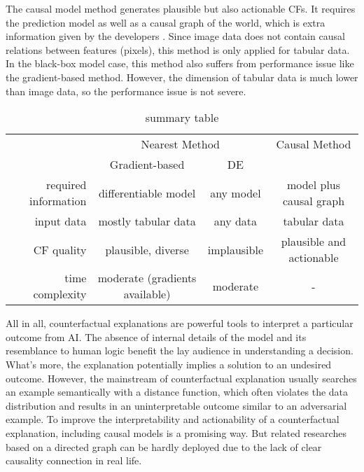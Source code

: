The causal model method generates plausible but also actionable CFs. It requires the prediction model as well as a causal graph of the world, which is extra information given by the developers \cite{preservingCausal}. Since image data does not contain causal relations between features (pixels), this method is only applied for tabular data. In the black-box model case, this method also suffers from performance issue like the gradient-based method. However, the dimension of tabular data is much lower than image data, so the performance issue is not severe.

\begin{table}
  \centering
\caption{summary table}
\begin{tabular}{|r|c|c|c|}
  \hline
   & \multicolumn{2}{c|}{Nearest Method} & Causal Method\\
   \cline{2-3}
   & Gradient-based & DE &  \\
   \hline
  required information & differentiable model  & any model & model plus causal graph \\
  input data & mostly tabular data & any data & tabular data \\
  CF quality & plausible, diverse& implausible& plausible and actionable\\
  time complexity & moderate (gradients available) &moderate& -\\
  \hline
\end{tabular}\label{tab:summary}

\label{summary table}
  \end{table}
All in all, counterfactual explanations are powerful tools to interpret a particular outcome from AI. The absence of internal details of the model and its resemblance to human logic benefit the lay audience in understanding a decision. What's more, the explanation potentially implies a solution to an undesired outcome. However, the mainstream of counterfactual explanation usually searches an example semantically with a distance function, which often violates the data distribution and results in an uninterpretable outcome similar to an adversarial example. To improve the interpretability and actionability of a counterfactual explanation, including causal models is a promising way. But related researches based on a directed graph can be hardly deployed due to the lack of clear causality connection in real life.    